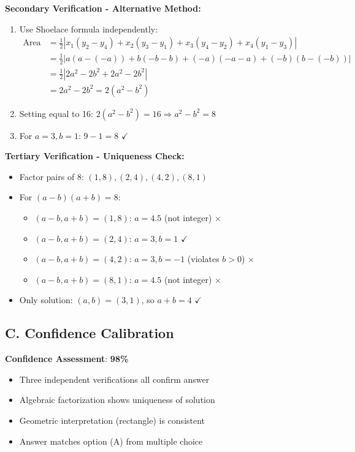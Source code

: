 \documentclass[]{article}
\begin{document}
\begin{verificationbox}
\textbf{Secondary Verification - Alternative Method:}
\begin{enumerate}
    \item Use Shoelace formula independently:
    \begin{align*}
    \text{Area} &= \frac{1}{2}|x_1(y_2-y_4) + x_2(y_3-y_1) + x_3(y_4-y_2) + x_4(y_1-y_3)|\\
    &= \frac{1}{2}|a(a-(-a)) + b(-b-b) + (-a)(-a-a) + (-b)(b-(-b))|\\
    &= \frac{1}{2}|2a^2 - 2b^2 + 2a^2 - 2b^2|\\
    &= 2a^2 - 2b^2 = 2(a^2-b^2)
    \end{align*}
    \item Setting equal to 16: $2(a^2-b^2) = 16 \Rightarrow a^2-b^2=8$
    \item For $a=3, b=1$: $9-1=8$ $\checkmark$
\end{enumerate}

\textbf{Tertiary Verification - Uniqueness Check:}
\begin{itemize}[leftmargin=*]
    \item Factor pairs of 8: $(1,8), (2,4), (4,2), (8,1)$
    \item For $(a-b)(a+b)=8$:
    \begin{itemize}
        \item $(a-b, a+b) = (1,8)$: $a=4.5$ (not integer) $\times$
        \item $(a-b, a+b) = (2,4)$: $a=3, b=1$ $\checkmark$
        \item $(a-b, a+b) = (4,2)$: $a=3, b=-1$ (violates $b>0$) $\times$
        \item $(a-b, a+b) = (8,1)$: $a=4.5$ (not integer) $\times$
    \end{itemize}
    \item Only solution: $(a,b) = (3,1)$, so $a+b=4$ $\checkmark$
\end{itemize}

\subsection*{C. Confidence Calibration}

\textbf{Confidence Assessment}: \textbf{98\%}
\begin{itemize}[leftmargin=*]
    \item Three independent verifications all confirm answer
    \item Algebraic factorization shows uniqueness of solution
    \item Geometric interpretation (rectangle) is consistent
    \item Answer matches option (A) from multiple choice
\end{itemize}


\end{verificationbox}
\end{document}
